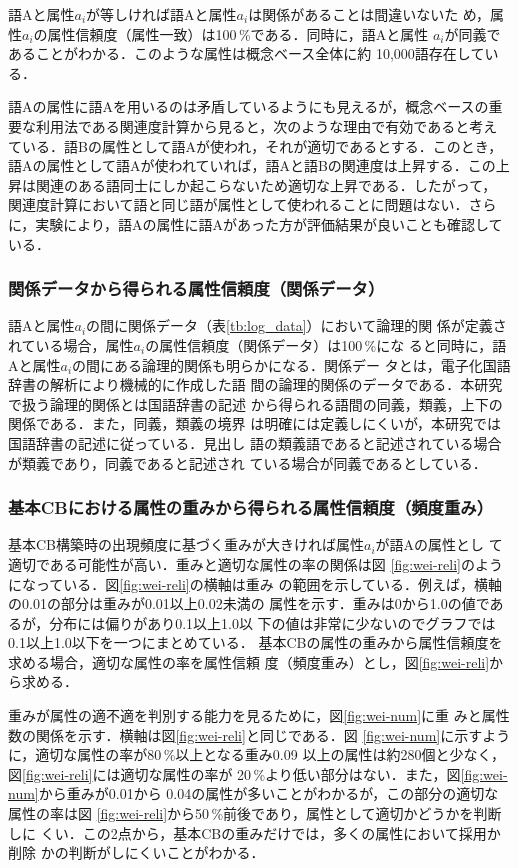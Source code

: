 語Aと属性$a_i$が等しければ語Aと属性$a_i$は関係があることは間違いないた
め，属性$a_i$の属性信頼度（属性一致）は100\,\%である．同時に，語Aと属性
$a_i$が同義であることがわかる．このような属性は概念ベース全体に約
10,000語存在している．

語Aの属性に語Aを用いるのは矛盾しているようにも見えるが，概念ベースの重
要な利用法である関連度計算から見ると，次のような理由で有効であると考え
ている．語Bの属性として語Aが使われ，それが適切であるとする．このとき，
語Aの属性として語Aが使われていれば，語Aと語Bの関連度は上昇する．この上
昇は関連のある語同士にしか起こらないため適切な上昇である．したがって，
関連度計算において語と同じ語が属性として使われることに問題はない．さら
に，実験により，語Aの属性に語Aがあった方が評価結果が良いことも確認して
いる．

\subsubsection{関係データから得られる属性信頼度（関係データ）}

語Aと属性$a_i$の間に関係データ（表\ref{tb:log_data}）において論理的関
係が定義されている場合，属性$a_i$の属性信頼度（関係データ）は100\,\%にな
ると同時に，語Aと属性$a_i$の間にある論理的関係も明らかになる．関係デー
タとは，電子化国語辞書の解析\cite{Kojima2000}により機械的に作成した語
間の論理的関係のデータである．本研究で扱う論理的関係とは国語辞書の記述
から得られる語間の同義，類義，上下の関係である．また，同義，類義の境界
は明確には定義しにくいが，本研究では国語辞書の記述に従っている．見出し
語の類義語であると記述されている場合が類義であり，同義であると記述され
ている場合が同義であるとしている．

\subsubsection{基本CBにおける属性の重みから得られる属性信頼度（頻度重み）}

基本CB構築時の出現頻度に基づく重みが大きければ属性$a_i$が語Aの属性とし
て適切である可能性が高い．重みと適切な属性の率の関係は図
\ref{fig:wei-reli}のようになっている．図\ref{fig:wei-reli}の横軸は重み
の範囲を示している．例えば，横軸の0.01の部分は重みが0.01以上0.02未満の
属性を示す．重みは0から1.0の値であるが，分布には偏りがあり0.1以上1.0以
下の値は非常に少ないのでグラフでは0.1以上1.0以下を一つにまとめている．
基本CBの属性の重みから属性信頼度を求める場合，適切な属性の率を属性信頼
度（頻度重み）とし，図\ref{fig:wei-reli}から求める．

重みが属性の適不適を判別する能力を見るために，図\ref{fig:wei-num}に重
みと属性数の関係を示す．横軸は図\ref{fig:wei-reli}と同じである．図
\ref{fig:wei-num}に示すように，適切な属性の率が80\,\%以上となる重み0.09
以上の属性は約280個と少なく，図\ref{fig:wei-reli}には適切な属性の率が
20\,\%より低い部分はない．また，図\ref{fig:wei-num}から重みが0.01から
0.04の属性が多いことがわかるが，この部分の適切な属性の率は図
\ref{fig:wei-reli}から50\,\%前後であり，属性として適切かどうかを判断しに
くい．この2点から，基本CBの重みだけでは，多くの属性において採用か削除
かの判断がしにくいことがわかる．

